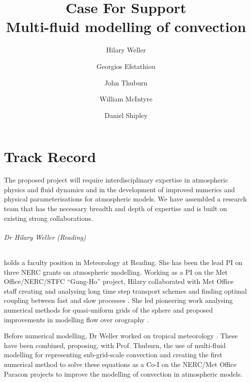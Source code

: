 \documentclass[11pt,a4paper]{article}
\begin{document}
\title{Case For Support \\ \Large
Multi-fluid modelling of convection
}
\author{Hilary Weller \and Georgios Efstathiou \and John Thuburn \and William McIntyre \and Daniel Shipley}
\date{}
\maketitle

\part{Track Record}

The proposed project will require interdisciplinary expertise in atmospheric physics and fluid dynamics
and in the development of improved numerics and physical parameterisations for atmospheric models.
We have assembled a research team that has the necessary breadth and depth of expertise and is built on
existing strong collaborations.


\paragraph*{Dr Hilary Weller (Reading)} holds a faculty position in Meteorology at Reading. She has been the lead PI on three NERC grants on atmospheric modelling. Working as a PI on the Met Office/NERC/STFC ``Gung-Ho'' project, Hilary collaborated with Met Office staff creating and analysing long time step transport schemes \cite[]{CWPS17,SWMD17} and finding optimal coupling between fast and slow processes \cite[][]{WLW13}. She led pioneering work analysing numerical methods for quasi-uniform grids of the sphere \cite[e.g.][]{Wel12,WTC12} and proposed improvements in modelling flow over orography \cite[]{WS14}. 

Before numerical modelling, Dr Weller worked on tropical meteorology \cite[e.g.][]{LGWS09}. These have been combined, proposing, with Prof. Thuburn, the use of multi-fluid modelling for representing sub-grid-scale convection \cite[]{TWV+18} and creating the first numerical method to solve these equations \cite[]{WM19} as a Co-I on the NERC/Met Office Paracon projects to improve the modelling of convection in atmospheric models.
\end{document}

